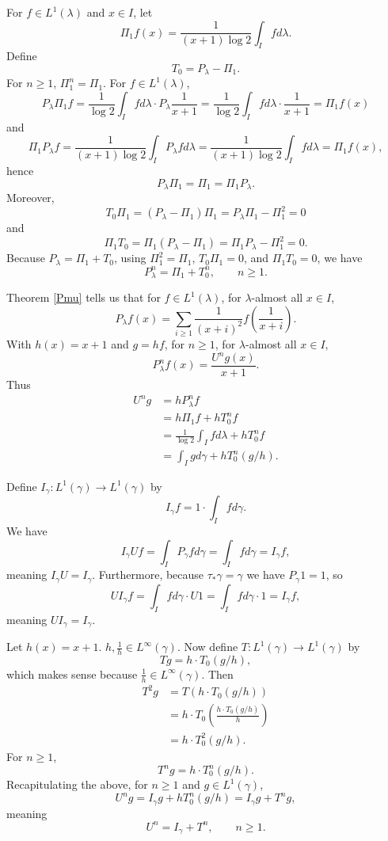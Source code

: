 \documentclass{article}
\theoremstyle{definition}
\begin{document}
For $f \in L^1(\lambda)$ and $x \in I$, let
\[
\Pi_1 f(x) = \frac{1}{(x+1) \log 2} \int_I f d\lambda.
\]
Define
\[
T_0 = P_\lambda - \Pi_1.
\]
For $n \geq 1$, $\Pi_1^n = \Pi_1$. For $f \in L^1(\lambda)$,
\[
P_\lambda \Pi_1 f =  \frac{1}{\log 2} \int_I f d\lambda\cdot P_\lambda \frac{1}{x+1}
= \frac{1}{\log 2} \int_I f d\lambda\cdot\frac{1}{x+1}
=\Pi_1 f(x)
\]
and
\[
\Pi_1 P_\lambda f=\frac{1}{(x+1)\log 2} \int_I P_\lambda f d\lambda
=\frac{1}{(x+1)\log 2} \int_I f d\lambda=\Pi_1 f(x),
\]
hence
\[
P_\lambda \Pi_1 = \Pi_1 = \Pi_1 P_\lambda.
\]
Moreover,
\[
T_0 \Pi_1 = (P_\lambda-\Pi_1) \Pi_1 = P_\lambda \Pi_1 - \Pi_1^2
=0
\]
and
\[
\Pi_1 T_0 = \Pi_1(P_\lambda-\Pi_1) = \Pi_1 P_\lambda - \Pi_1^2
=0.
\]
Because $P_\lambda=\Pi_1+T_0$, using $\Pi_1^2=\Pi_1$,
$T_0 \Pi_1 = 0$, and
$\Pi_1 T_0 = 0$, we have
\[
P_\lambda^n = \Pi_1+T_0^n,\qquad n \geq 1.
\]

Theorem \ref{Pmu} tells us that for $f \in L^1(\lambda)$, 
for $\lambda$-almost all $x \in I$,
\[
P_\lambda f(x) = \sum_{i \geq 1} \frac{1}{(x+i)^2} f\left(\frac{1}{x+i}\right).
\]
With $h(x)=x+1$ and $g=hf$, for $n \geq 1$, for $\lambda$-almost all $x \in I$,
\[
P_\lambda^n f(x) = \frac{U^n g(x)}{x+1}.
\]
Thus
\begin{align*}
U^n g &= h P_\lambda^n f\\
&= h \Pi_1 f + h T_0^n f\\
&= \frac{1}{\log 2} \int_I f d\lambda + h T_0^n f\\
&=\int_I g d\gamma + h T_0^n(g/h).
\end{align*}

Define $I_\gamma:L^1(\gamma) \to L^1(\gamma)$ by 
\[
I_\gamma f = 1 \cdot \int_I f d\gamma.
\]
We have
\[
I_\gamma U f = \int_I P_\gamma f d\gamma = \int_I f d\gamma = I_\gamma f,
\]
meaning $I_\gamma U = I_\gamma$. Furthermore, because
$\tau_* \gamma = \gamma$ we have $P_\gamma 1 = 1$, so
\[
U I_\gamma f =  \int_I f d\gamma \cdot U 1 = \int_I f d\gamma \cdot 1 = I_\gamma f ,
\]
meaning $U I_\gamma = I_\gamma$. 

Let $h(x)=x+1$. $h, \frac{1}{h} \in L^\infty(\gamma)$.
Now define $T:L^1(\gamma) \to L^1(\gamma)$ by
\[
T g = h \cdot T_0(g/h),
\]
which makes sense because $\frac{1}{h} \in L^\infty(\gamma)$. 
Then
\begin{align*}
T^2 g& = T(h \cdot T_0(g/h))\\
&= h \cdot T_0\left(\frac{h \cdot T_0(g/h)}{h}\right)\\
&=h \cdot T_0^2(g/h).
\end{align*}
For $n \geq 1$,
\[
T^n g = h \cdot T_0^n(g/h).
\]
Recapitulating the above, for $n \geq 1$ and $g \in L^1(\gamma)$, 
\[
U^n g = I_\gamma g + h T_0^n(g/h) = I_\gamma g + T^n g,
\]
meaning
\[
U^n = I_\gamma + T^n,\qquad n \geq 1.
\]
\end{document}
